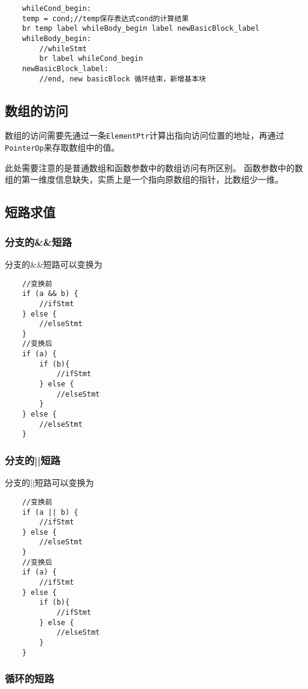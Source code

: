\begin{verbatim}
    whileCond_begin:
    temp = cond;//temp保存表达式cond的计算结果
    br temp label whileBody_begin label newBasicBlock_label
    whileBody_begin:
        //whileStmt
        br label whileCond_begin
    newBasicBlock_label:
        //end, new basicBlock 循环结束，新增基本块
\end{verbatim}

\subsection{数组的访问}
数组的访问需要先通过一条\texttt{ElementPtr}计算出指向访问位置的地址，再通过\texttt{PointerOp}来存取数组中的值。

此处需要注意的是普通数组和函数参数中的数组访问有所区别。
函数参数中的数组的第一维度信息缺失，实质上是一个指向原数组的指针，比数组少一维。

\subsection{短路求值}

\subsubsection{分支的\&\&短路}
分支的\&\&短路可以变换为
\begin{verbatim}
    //变换前
    if (a && b) {
        //ifStmt
    } else {
        //elseStmt
    }
    //变换后
    if (a) {
        if (b){
            //ifStmt
        } else {
            //elseStmt
        }
    } else {
        //elseStmt
    }

\end{verbatim}


\subsubsection{分支的||短路}

分支的||短路可以变换为
\begin{verbatim}
    //变换前
    if (a || b) {
        //ifStmt
    } else {
        //elseStmt
    }
    //变换后
    if (a) {
        //ifStmt
    } else {
        if (b){
            //ifStmt
        } else {
            //elseStmt
        }
    }

\end{verbatim}


\subsubsection{循环的短路}

